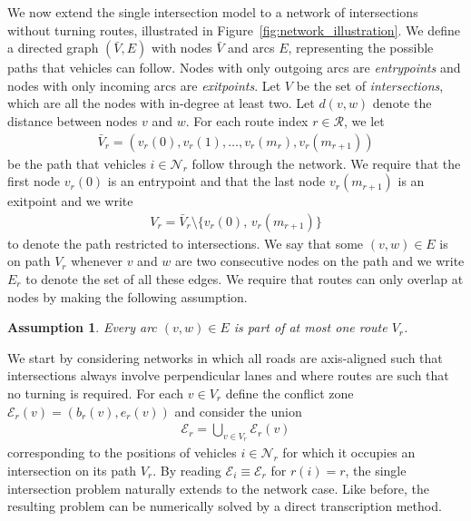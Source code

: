 \documentclass[a4paper]{article}
\theoremstyle{definition}
\theoremstyle{plain}
\newtheorem{assump}{Assumption}[section]
\begin{document}
We now extend the single intersection model to a network of intersections
without turning routes, illustrated in Figure~\ref{fig:network_illustration}.
We define a directed graph $(\bar{V},E)$ with nodes $\bar{V}$ and arcs $E$,
representing the possible paths that vehicles can follow. Nodes with only
outgoing arcs are \textit{entrypoints} and nodes with only incoming arcs are \textit{exitpoints}.
Let $V$ be the set of \textit{intersections}, which are all the nodes with
in-degree at least two.
%
Let $d(v, w)$ denote the distance between nodes $v$ and $w$.
%
For each route index $r \in \mathcal{R}$, we let
\begin{align*}
  \bar{V}_{r} = (v_{r}(0), v_{r}(1), \dots, v_{r}(m_{r}), v_{r}(m_{r+1}))
\end{align*}
be the path that vehicles $i \in \mathcal{N}_{r}$ follow through the network. We
require that the first node $v_{r}(0)$ is an entrypoint and that the last node
$v_{r}(m_{r+1})$ is an exitpoint and we write
\begin{align*}
  V_{r} = \bar{V}_{r} \setminus \{ v_{r}(0), \, v_{r}(m_{r+1}) \}
\end{align*}
to denote the path restricted to intersections. We say that some $(v, w) \in E$
is on path $V_{r}$ whenever $v$ and $w$ are two consecutive nodes on the path
and we write $E_{r}$ to denote the set of all these edges. We require that
routes can only overlap at nodes by making the following assumption.

\begin{assump}\label{assump:disjoint_routes}
  Every arc $(v,w) \in E$ is part of at most one route $V_{r}$.
\end{assump}

We start by considering networks in which all roads are axis-aligned such that
intersections always involve perpendicular lanes and where routes are such that
no turning is required. For each $v \in V_{r}$ define the conflict zone
$\mathcal{E}_{r}(v) = (b_{r}(v), e_{r}(v))$ and consider the union
\begin{align*}
  \mathcal{E}_{r} = \bigcup_{v \in V_{r}} \mathcal{E}_{r}(v)
\end{align*}
corresponding to the positions of vehicles $i \in \mathcal{N}_{r}$ for which it
occupies an intersection on its path $V_{r}$.
%
By reading $\mathcal{E}_{i} \equiv \mathcal{E}_{r}$ for $r(i) = r$, the single
intersection problem naturally extends to the network case. Like before, the
resulting problem can be numerically solved by a direct transcription method.
\end{document}
